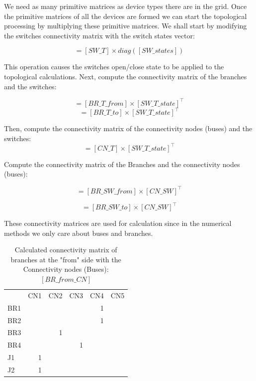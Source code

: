 \documentclass[nols,a4paper,twoside,notoc,fleqn]{tufte-book}
\begin{document}
\vspace{1cm}

We need as many primitive matrices as device types there are in the grid. Once the primitive matrices of all the devices are formed we can start the topological processing by multiplying these primitive matrices. We shall start by modifying the switches connectivity matrix with the switch states vector:

\begin{equation}
[SW\_T\_state] = [SW\_T] \times diag([SW\_states])
\end{equation}

This operation causes the switches open/close state to be applied to the topological calculations. Next, compute the connectivity matrix of the branches and the switches:

\begin{equation}
[BR\_SW\_from] = [BR\_T\_from] \times [SW\_T\_state]^\top
\end{equation}
\begin{equation}
[BR\_SW\_to] = [BR\_T\_to] \times [SW\_T\_state]^\top
\end{equation}

Then, compute the connectivity matrix of the connectivity nodes (buses) and the switches:
\begin{equation}
[CN\_SW] = [CN\_T] \times [SW\_T\_state]^\top
\end{equation}

Compute the connectivity matrix of the Branches and the connectivity nodes (buses):

\begin{equation}
[BR\_from\_CN] = [BR\_SW\_from]  \times [CN\_SW]^\top
\end{equation}

\begin{equation}
[BR\_to\_CN] = [BR\_SW\_to]  \times [CN\_SW]^\top
\end{equation}

These connectivity matrices are used for calculation since in the numerical methods we only care about buses and branches.


\begin{table}[ht]
	 \begin{tabular}{lrrrrr}
		{} &  CN1 &  CN2 &  CN3 &  CN4 &  CN5 \\
		BR1 &      &      &      &    1 &      \\
		BR2 &      &      &      &    1 &      \\
		BR3 &      &    1 &      &      &      \\
		BR4 &      &      &    1 &      &      \\
		J1  &    1 &      &      &      &      \\
		J2  &    1 &      &      &      &      \\
	\end{tabular}
	\caption{Calculated connectivity matrix of branches at the "from" side with the Connectivity nodes (Buses): $[BR\_from\_CN]$}
\end{table}
\end{document}
